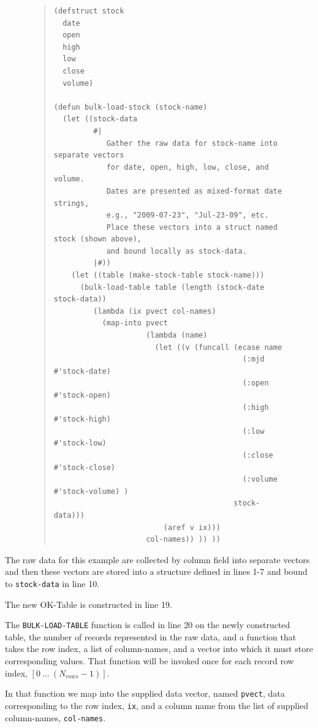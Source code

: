 \documentclass[article,oneside]{memoir}
\begin{document}
\begin{figure}[!htbp]
\begin{quote}
\lstset{language=Lisp,caption=Example of bulk-loading an OK-Table,label= BulkLoadingExample}
\begin{lstlisting}
(defstruct stock
  date
  open
  high
  low
  close
  volume)

(defun bulk-load-stock (stock-name)
  (let ((stock-data
         #|
            Gather the raw data for stock-name into separate vectors
            for date, open, high, low, close, and volume.
            Dates are presented as mixed-format date strings,
            e.g., "2009-07-23", "Jul-23-09", etc.
            Place these vectors into a struct named stock (shown above),
            and bound locally as stock-data.
         |#))
    (let ((table (make-stock-table stock-name)))
      (bulk-load-table table (length (stock-date stock-data))
         (lambda (ix pvect col-names)
           (map-into pvect
                     (lambda (name)
                       (let ((v (funcall (ecase name
                                           (:mjd    #'stock-date)
                                           (:open   #'stock-open)
                                           (:high   #'stock-high)
                                           (:low    #'stock-low)
                                           (:close  #'stock-close)
                                           (:volume #'stock-volume) )
                                         stock-data)))
                         (aref v ix)))
                     col-names)) )) ))
\end{lstlisting}
\end{quote}
\end{figure}

The raw data for this example are collected by column field into separate vectors and then these vectors are stored into a structure defined in lines 1-7 and bound to \texttt{stock-data} in line 10. 

The new OK-Table is constructed in line 19.

The \texttt{BULK-LOAD-TABLE} function is called in line 20 on the newly constructed table, the number of records represented in the raw data, and a function that takes the row index, a list of column-names, and a vector into which it must store corresponding values. That function will be invoked once for each record row index, $[0~ ... ~(N_{rows}-1)]$.

In that function we map into the supplied data vector, named \texttt{pvect}, data corresponding to the row index, \texttt{ix}, and a column name from the list of supplied column-names, \texttt{col-names}. 
\end{document}
